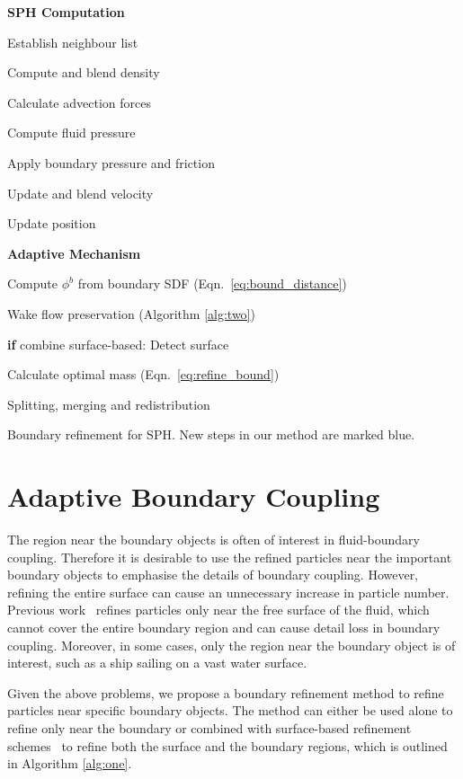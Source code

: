 \documentclass[VANCOUVER,STIX1COL]{WileyNJD-v2}
\begin{document}
\begin{algorithm}[htb]
\par\setlength\parindent{2em}
\noindent \textbf{SPH Computation} 

Establish neighbour list

Compute and blend density

Calculate advection forces

Compute fluid pressure

Apply boundary pressure and friction

Update and blend velocity

Update position

\noindent \textbf{Adaptive Mechanism} 

\textcolor[RGB]{71,156,233}{Compute $\phi^b$ from boundary SDF (Eqn.~\ref{eq:bound_distance})}

\textcolor[RGB]{71,156,233}{Wake flow preservation (Algorithm \ref{alg:two})}

\textbf{if} combine surface-based: Detect surface

\textcolor[RGB]{71,156,233}{Calculate optimal mass (Eqn.~\ref{eq:refine_bound})}

Splitting, merging and redistribution

\caption{Boundary refinement for SPH. New steps in our method are marked blue.}
\label{alg:one}
\end{algorithm}

\section{Adaptive Boundary Coupling}
\label{sec:adaptive_our}

The region near the boundary objects is often of interest in fluid-boundary coupling. Therefore it is desirable to use the refined particles near the important boundary objects to emphasise the details of boundary coupling. However, refining the entire surface can cause an unnecessary increase in particle number. Previous work~\cite{Winchenbach17} refines particles only near the free surface of the fluid, which cannot cover the entire boundary region and can cause detail loss in boundary coupling. Moreover, in some cases, only the region near the boundary object is of interest, such as a ship sailing on a vast water surface.

Given the above problems, we propose a boundary refinement method to refine particles near specific boundary objects. The method can either be used alone to refine only near the boundary or combined with surface-based refinement schemes~\cite{Winchenbach17} to refine both the surface and the boundary regions, which is outlined in Algorithm \ref{alg:one}.
\end{document}

